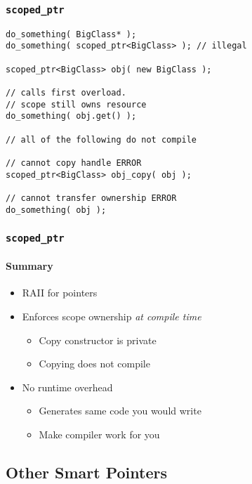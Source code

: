 \begin{frame}[fragile]
    \frametitle{\texttt{scoped\_ptr}}
    \begin{lstlisting}[title=Compile time enforcement]
do_something( BigClass* );
do_something( scoped_ptr<BigClass> ); // illegal

scoped_ptr<BigClass> obj( new BigClass );

// calls first overload.
// scope still owns resource
do_something( obj.get() );

// all of the following do not compile

// cannot copy handle ERROR
scoped_ptr<BigClass> obj_copy( obj );

// cannot transfer ownership ERROR
do_something( obj );
    \end{lstlisting}
\end{frame}

\begin{frame}[fragile]
    \frametitle{\texttt{scoped\_ptr}}
    \framesubtitle{Summary}
    \begin{itemize}
        \item RAII for pointers
        \item Enforces scope ownership \emph{at compile time}
            \begin{itemize}
                \item Copy constructor is private
                \item Copying does not compile
            \end{itemize}
        \item No runtime overhead
            \begin{itemize}
                \item Generates same code you would write
                \item Make compiler work for you
            \end{itemize}
    \end{itemize}
\end{frame}



\subsection{Other Smart Pointers}
\frame{\subsectionpage}

